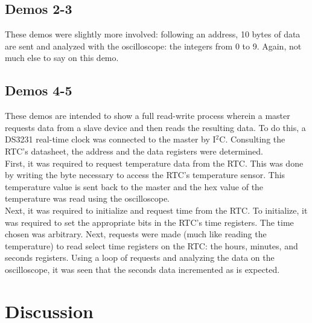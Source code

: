 \documentclass{article}
\begin{document}
\subsection{Demos 2-3}

These demos were slightly more involved: following an address, 10 bytes of data are sent and analyzed with the oscilloscope: the integers from 0 to 9. Again, not much else to say on this demo.\\

\subsection{Demos 4-5}

These demos are intended to show a full read-write process wherein a master requests data from a slave device and then reads the resulting data. To do this, a DS3231 real-time clock was connected to the master by I\(^2\)C. Consulting the RTC's datasheet, the address and the data registers were determined.\\

\noindent First, it was required to request temperature data from the RTC. This was done by writing the byte necessary to access the RTC's temperature sensor. This temperature value is sent back to the master and the hex value of the temperature was read using the oscilloscope.\\

\noindent Next, it was required to initialize and request time from the RTC. To initialize, it was required to set the appropriate bits in the RTC's time registers. The time chosen was arbitrary. Next, requests were made (much like reading the temperature) to read select time registers on the RTC: the hours, minutes, and seconds registers. Using a loop of requests and analyzing the data on the oscilloscope, it was seen that the seconds data incremented as is expected.\\



\section{Discussion}
\label{sec:Discussion}
\end{document}
